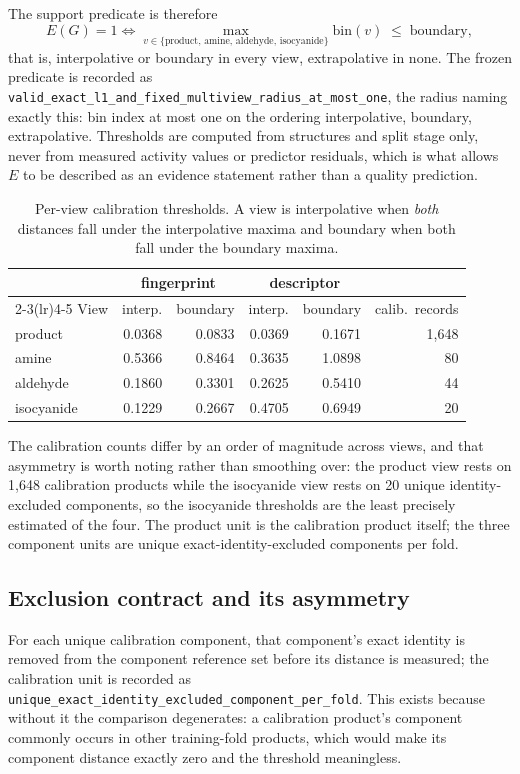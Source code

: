 \documentclass{article}
\newcounter{none}
\begin{document}
The support predicate is therefore
%
\[
E(G) = 1
\iff
\max_{v \in \{\mathrm{product},\, \mathrm{amine},\, \mathrm{aldehyde},\, \mathrm{isocyanide}\}}
\mathrm{bin}(v) \;\leq\; \text{boundary},
\]
%
that is, interpolative or boundary in every view, extrapolative in none. The frozen predicate is
recorded as \texttt{valid\_exact\_l1\_and\_fixed\_multiview\_radius\_at\_most\_one}, the radius
naming exactly this: bin index at most one on the ordering interpolative, boundary, extrapolative.
Thresholds are computed from structures and split stage only, never from measured activity values or
predictor residuals, which is what allows $E$ to be described as an evidence statement rather than a
quality prediction.
\begin{table}[h]
\centering
\caption{Per-view calibration thresholds. A view is interpolative when \emph{both} distances fall
under the interpolative maxima and boundary when both fall under the boundary maxima.}
\label{tab:thresholds}
\small
\begin{tabular}{@{}lrrrrr@{}}
\toprule
 & \multicolumn{2}{c}{fingerprint} & \multicolumn{2}{c}{descriptor} & \\
\cmidrule(lr){2-3}\cmidrule(lr){4-5}
View & interp. & boundary & interp. & boundary & calib.\ records \\
\midrule
product     & 0.0368 & 0.0833 & 0.0369 & 0.1671 & 1{,}648 \\
amine       & 0.5366 & 0.8464 & 0.3635 & 1.0898 & 80 \\
aldehyde    & 0.1860 & 0.3301 & 0.2625 & 0.5410 & 44 \\
isocyanide  & 0.1229 & 0.2667 & 0.4705 & 0.6949 & 20 \\
\bottomrule
\end{tabular}
\end{table}

The calibration counts differ by an order of magnitude across views, and that asymmetry is worth
noting rather than smoothing over: the product view rests on 1,648 calibration products while the
isocyanide view rests on 20 unique identity-excluded components, so the isocyanide thresholds are the
least precisely estimated of the four. The product unit is the calibration product itself; the three
component units are unique exact-identity-excluded components per fold.

\subsection{Exclusion contract and its asymmetry}
\label{app:exclusion}
For each unique calibration component, that component's exact identity is removed from the
component reference set before its distance is measured; the calibration unit is recorded as
\texttt{unique\_exact\_identity\_excluded\_component\_per\_fold}. This exists because without it the
comparison degenerates: a calibration product's component commonly occurs in other training-fold
products, which would make its component distance exactly zero and the threshold meaningless.
\end{document}
